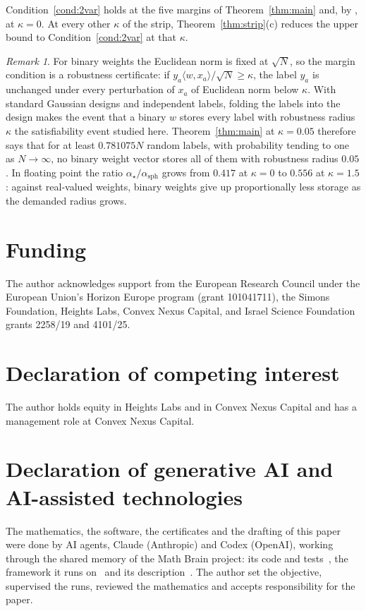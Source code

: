 \documentclass[11pt]{article}
\theoremstyle{remark}
\newtheorem{rmk}[theorem]{Remark}
\begin{document}
Condition~\ref{cond:2var} holds at the five margins of
Theorem~\ref{thm:main} and, by \cite{shmalo2026capacity}, at
$\kappa=0$.  At every other $\kappa$ of the strip,
Theorem~\ref{thm:strip}(c) reduces the upper bound to
Condition~\ref{cond:2var} at that $\kappa$.

\begin{rmk}
For binary weights the Euclidean norm is fixed at $\sqrt N$, so the
margin condition is a robustness certificate: if
$y_a\langle w,x_a\rangle/\sqrt N\ge\kappa$, the label $y_a$ is
unchanged under every perturbation of $x_a$ of Euclidean norm below
$\kappa$.  With standard Gaussian designs and independent labels,
folding the labels into the design makes the event that a binary $w$
stores every label with robustness radius $\kappa$ the satisfiability
event studied here.  Theorem~\ref{thm:main} at $\kappa=0.05$ therefore
says that for at least $0.781075N$ random labels, with probability
tending to one as $N\to\infty$, no binary weight vector stores all of
them with robustness radius $0.05$.  In floating point the ratio
$\alpha_\star/\alpha_{\mathrm{sph}}$ grows from $0.417$ at $\kappa=0$
to $0.556$ at $\kappa=1.5$: against real-valued weights, binary
weights give up proportionally less storage as the demanded radius
grows.
\end{rmk}





\section*{Funding}
The author acknowledges support from the European Research Council under the
European Union's Horizon Europe program (grant 101041711), the Simons
Foundation, Heights Labs, Convex Nexus Capital, and Israel Science
Foundation grants 2258/19 and 4101/25.

\section*{Declaration of competing interest}
The author holds equity in Heights Labs and in Convex Nexus Capital and
has a management role at Convex Nexus Capital.

\section*{Declaration of generative AI and AI-assisted technologies}
The mathematics, the software, the certificates and the drafting of
this paper were done by AI agents, Claude (Anthropic) and Codex
(OpenAI), working through the shared memory of the Math Brain
project: its code and tests~\cite{MathBrainRepo}, the framework it
runs on~\cite{BrainFramework} and its description~\cite{MathBrainPaper}.  The
author set the objective, supervised the runs, reviewed the
mathematics and accepts responsibility for the paper.
\end{document}

